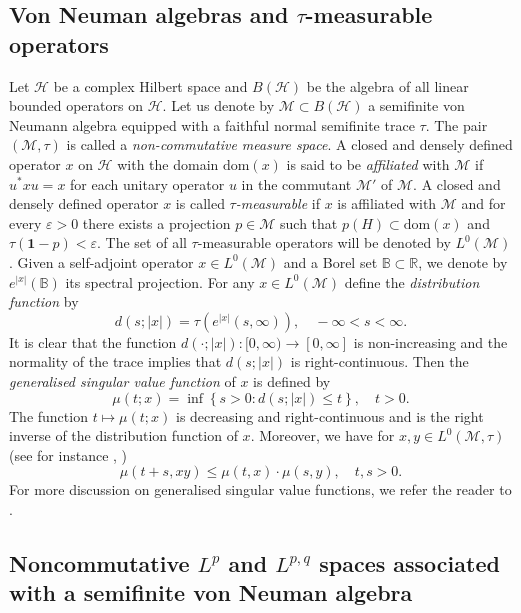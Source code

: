 \documentclass[a4paper,12pt]{amsart}
\numberwithin{equation}{section}
\theoremstyle{definition}
\begin{document}
\subsection{Von Neuman algebras and $\tau$-measurable operators}
Let $\mathcal{H}$ be a complex Hilbert space and $B(\mathcal{H})$ be the algebra of all linear bounded operators on $\mathcal{H}.$ Let us denote by $\mathcal{M}\subset B(\mathcal{H})$ a semifinite  von Neumann algebra equipped with a faithful normal semifinite trace $\tau.$ The pair $(\mathcal{M},\tau)$ is called a \textit{non-commutative measure space}. A closed and densely defined operator $x$ on $\mathcal{H}$ with the domain $\mathrm{dom}(x)$ is said to be \textit{affiliated} with $\mathcal{M}$ if $u^{\ast}xu=x$ for each unitary operator $u$ in the commutant $\mathcal{M}'$ of $\mathcal{M}$. A closed and densely defined operator $x$ is called \textit{$\tau$-measurable} if $x$ is affiliated with $\mathcal{M}$ and for every $\varepsilon>0$ there exists a projection $p\in \mathcal{M}$ such that $p(H)\subset \mathrm{dom}(x)$ and $\tau(\mathbf{1}-p)<\varepsilon.$
The set of all $\tau$-measurable operators will be denoted by $L^0(\mathcal{M})$. Given a self-adjoint operator $x\in L^0(\mathcal{M})$ and a Borel set $\mathbb{B}\subset\mathbb{R}$, we denote by  $e^{|x|}(\mathbb{B})$ its spectral projection.
For any $x\in L^0(\mathcal{M})$ define the \textit{distribution function} by
$$d(s;|x|)=\tau(e^{|x|}(s,\infty)), \quad -\infty<s<\infty.$$
It is clear that the function $d(\cdot;|x|):[0,\infty)\rightarrow[0,\infty]$ is non-increasing and the normality of the trace implies that $d(s;|x|)$ is right-continuous.
Then the \textit{generalised singular value function} of $x$ is defined by
$$\mu(t;x)=\inf\left\{s>0: d(s;|x|)\leq t\right\}, \quad t>0.$$
The function $t\mapsto\mu(t;x)$ is decreasing and right-continuous and is the right inverse of the distribution function of $x.$ 
Moreover, we have for $x,y \in L^0(\mathcal{M},\tau)$ (see for instance \cite[Corollary 2.3.16 (b)]{LSZ}, \cite{FK})
\begin{equation}\label{decreas-proper}
\mu(t+s,xy)\leq\mu(t,x)\cdot\mu(s,y),\quad t,s>0.
\end{equation} For more discussion on generalised singular value functions, we refer the reader to 
\cite{DPS, FK, LSZ}.

\subsection{Noncommutative $L^p$ and $L^{p,q}$ spaces associated with a semifinite von Neuman algebra}
\end{document}
